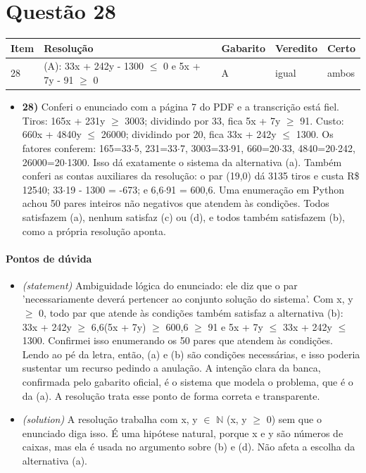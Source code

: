 \documentclass{article}%
\begin{document}
\section*{Questão 28}%
\begin{longtable}{@{}p{} p{} p{} p{} p{}@{}}\toprule Item & Resolução & Gabarito & Veredito & Certo \\ \midrule
28 & (A): 33x + 242y - 1300 $\leq$ 0 e 5x + 7y - 91 $\geq$ 0 & A & igual & ambos \\
\bottomrule\end{longtable}%
\begin{itemize}%
\item%
\textbf{28)} Conferi o enunciado com a página 7 do PDF e a transcrição está fiel. Tiros: 165x + 231y $\geq$ 3003; dividindo por 33, fica 5x + 7y $\geq$ 91. Custo: 660x + 4840y $\leq$ 26000; dividindo por 20, fica 33x + 242y $\leq$ 1300. Os fatores conferem: 165=33$\cdot$5, 231=33$\cdot$7, 3003=33$\cdot$91, 660=20$\cdot$33, 4840=20$\cdot$242, 26000=20$\cdot$1300. Isso dá exatamente o sistema da alternativa (a). Também conferi as contas auxiliares da resolução: o par (19,0) dá 3135 tiros e custa R\$ 12540; 33$\cdot$19 - 1300 = -673; e 6,6$\cdot$91 = 600,6. Uma enumeração em Python achou 50 pares inteiros não negativos que atendem às condições. Todos satisfazem (a), nenhum satisfaz (c) ou (d), e todos também satisfazem (b), como a própria resolução aponta.%
\end{itemize}%
\paragraph{Pontos de dúvida}%
\begin{itemize}%
\item%
\textit{(statement)} Ambiguidade lógica do enunciado: ele diz que o par 'necessariamente deverá pertencer ao conjunto solução do sistema'. Com x, y $\geq$ 0, todo par que atende às condições também satisfaz a alternativa (b): 33x + 242y $\geq$ 6,6(5x + 7y) $\geq$ 600,6 $\geq$ 91 e 5x + 7y $\leq$ 33x + 242y $\leq$ 1300. Confirmei isso enumerando os 50 pares que atendem às condições. Lendo ao pé da letra, então, (a) e (b) são condições necessárias, e isso poderia sustentar um recurso pedindo a anulação. A intenção clara da banca, confirmada pelo gabarito oficial, é o sistema que modela o problema, que é o da (a). A resolução trata esse ponto de forma correta e transparente.%
\item%
\textit{(solution)} A resolução trabalha com x, y $\in$ $\mathbb{N}$ (x, y $\geq$ 0) sem que o enunciado diga isso. É uma hipótese natural, porque x e y são números de caixas, mas ela é usada no argumento sobre (b) e (d). Não afeta a escolha da alternativa (a).%
\end{itemize}%
\end{document}
